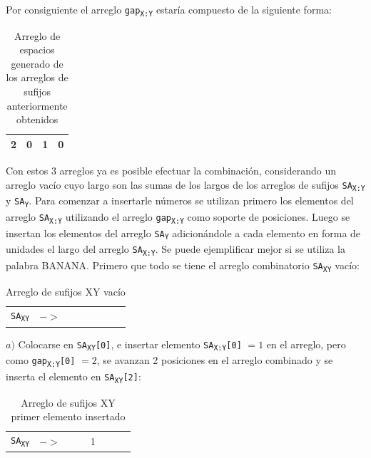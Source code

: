 Por consiguiente el arreglo \texttt{gap\textsubscript{X:Y}} estaría compuesto de la siguiente forma:

\begin{table}[!hbt]
\centering
\begin{tabular}{|l|l|l|l|}
\hline
2 & 0 & 1 & 0 \\ \hline
\end{tabular}
\caption{Arreglo de espacios generado de los arreglos de sufijos anteriormente obtenidos}
\end{table} 

Con estos 3 arreglos ya es posible efectuar la combinación, considerando un arreglo vacío cuyo largo son las sumas de los largos de los arreglos de sufijos \texttt{SA\textsubscript{X:Y}} y \texttt{SA\textsubscript{Y}}. Para comenzar a insertarle números se utilizan primero los elementos del arreglo \texttt{SA\textsubscript{X:Y}} utilizando el arreglo \texttt{gap\textsubscript{X:Y}} como soporte de posiciones. Luego se insertan los elementos del arreglo \texttt{SA\textsubscript{Y}} adicionándole a cada elemento en forma de unidades el largo del arreglo \texttt{SA\textsubscript{X:Y}}. Se puede ejemplificar mejor si se utiliza la palabra BANANA. Primero que todo se tiene el arreglo combinatorio \texttt{SA\textsubscript{XY}} vacío:

\begin{table}[!hbt]
\centering
\begin{tabular}{cc|c|c|c|c|c|c|}
\cline{3-8}
\texttt{SA\textsubscript{XY}} &  $->$ &  &  &  &  &  &  \\ \cline{3-8} 
\end{tabular}
\caption{Arreglo de sufijos XY vacío}
\end{table}

\newpage

$a)$ Colocarse en \texttt{SA\textsubscript{XY}[0]}, e insertar elemento \texttt{SA\textsubscript{X:Y}[0]} $= 1$ en el arreglo, pero como \texttt{gap\textsubscript{X:Y}[0]} $= 2$, se avanzan 2 posiciones en el arreglo combinado y se inserta el elemento en \texttt{SA\textsubscript{XY}[2]}:

\begin{table}[!hbt]
\centering
\begin{tabular}{cc|c|c|c|c|c|c|}
\cline{3-8}
\texttt{SA\textsubscript{XY}} &  $->$ &  &  & 1 &  &  &  \\ \cline{3-8} 
\end{tabular}
\caption{Arreglo de sufijos XY primer elemento insertado}
\end{table}

